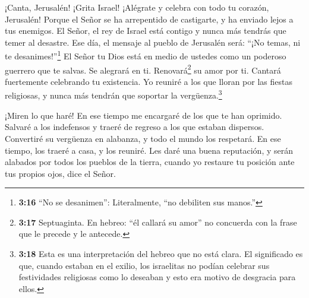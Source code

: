  ¡Canta, Jerusalén! ¡Grita Israel! ¡Alégrate y celebra con
todo tu corazón, Jerusalén!  Porque el Señor se ha
arrepentido de castigarte, y ha enviado lejos a tus enemigos. El Señor,
el rey de Israel está contigo y nunca más tendrás que temer al desastre.
 Ese día, el mensaje al pueblo de Jerusalén será: ``¡No
temas, ni te desanimes!''\footnote{\textbf{3:16} ``No se desanimen'':
  Literalmente, ``no debiliten sus manos.''}  El Señor tu
Dios está en medio de ustedes como un poderoso guerrero que te salvas.
Se alegrará en ti. Renovará\footnote{\textbf{3:17} Septuaginta. En
  hebreo: ``él callará su amor'' no concuerda con la frase que le
  precede y le antecede.} su amor por ti. Cantará fuertemente celebrando
tu existencia.  Yo reuniré a los que lloran por las fiestas
religiosas, y nunca más tendrán que soportar la vergüenza.\footnote{\textbf{3:18}
  Esta es una interpretación del hebreo que no está clara. El
  significado es que, cuando estaban en el exilio, los israelitas no
  podían celebrar sus festividades religiosas como lo deseaban y esto
  era motivo de desgracia para ellos.}

 ¡Miren lo que haré! En ese tiempo me encargaré de los que
te han oprimido. Salvaré a los indefensos y traeré de regreso a los que
estaban dispersos. Convertiré su vergüenza en alabanza, y todo el mundo
los respetará.  En ese tiempo, los traeré a casa, y los
reuniré. Les daré una buena reputación, y serán alabados por todos los
pueblos de la tierra, cuando yo restaure tu posición ante tus propios
ojos, dice el Señor.
